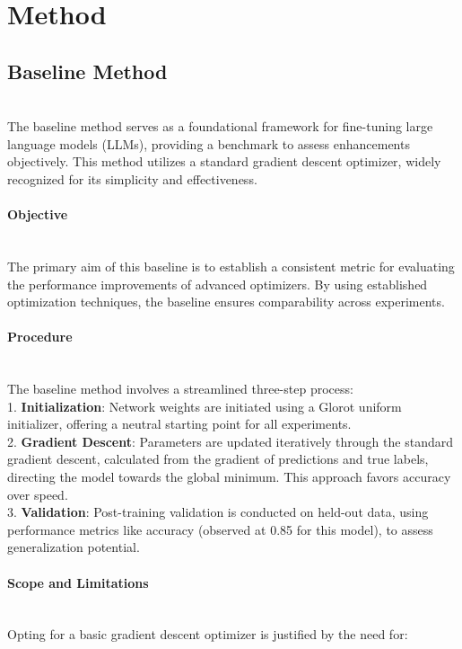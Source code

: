 \documentclass{article} %
\begin{document}
\section{Method}
\label{sec:method}
\subsection{Baseline Method}\\
The baseline method serves as a foundational framework for fine-tuning large language models (LLMs), providing a benchmark to assess enhancements objectively. This method utilizes a standard gradient descent optimizer, widely recognized for its simplicity and effectiveness.\\
\paragraph{Objective}\\
The primary aim of this baseline is to establish a consistent metric for evaluating the performance improvements of advanced optimizers. By using established optimization techniques, the baseline ensures comparability across experiments.\\
\paragraph{Procedure}\\
The baseline method involves a streamlined three-step process:\\
1. \textbf{Initialization}: Network weights are initiated using a Glorot uniform initializer, offering a neutral starting point for all experiments.\\
2. \textbf{Gradient Descent}: Parameters are updated iteratively through the standard gradient descent, calculated from the gradient of predictions and true labels, directing the model towards the global minimum. This approach favors accuracy over speed.\\
3. \textbf{Validation}: Post-training validation is conducted on held-out data, using performance metrics like accuracy (observed at 0.85 for this model), to assess generalization potential.\\
\paragraph{Scope and Limitations}\\
Opting for a basic gradient descent optimizer is justified by the need for:\\
\end{document}
